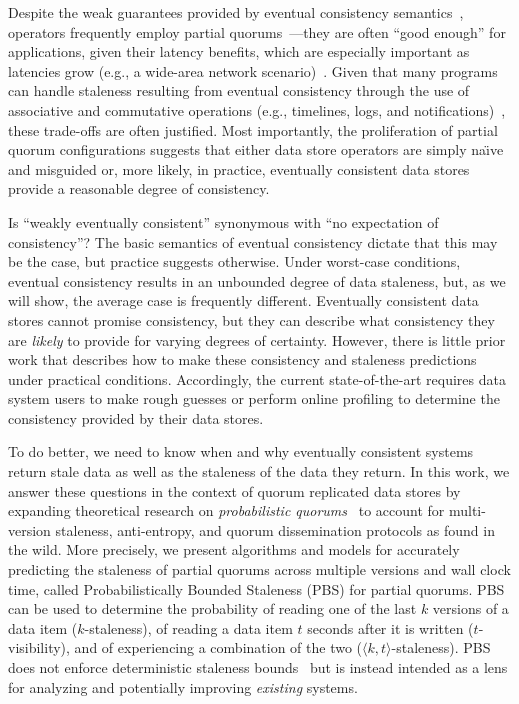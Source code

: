 \documentclass{vldb}
\begin{document}
Despite the weak guarantees provided by eventual consistency
semantics~\cite{hamilton-cap, cops, walter}, operators frequently
employ partial quorums~\cite{cassandra, cassandra-docs,
  cassandradefault,feinbergpc,reddit, outbrain, maxperfblog}---they are
often ``good enough'' for applications, given their latency benefits,
which are especially important as latencies grow (e.g., a wide-area
network scenario)~\cite{abadilatconsist, feinbergpc}.  Given that many
programs can handle staleness resulting from eventual consistency
through the use of associative and commutative operations (e.g.,
timelines, logs, and notifications)~\cite{calm, helland}, these
trade-offs are often justified.  Most importantly, the proliferation
of partial quorum configurations suggests that either data store
operators are simply na\"{\i}ve and misguided or, more likely, in
practice, eventually consistent data stores provide a reasonable degree
of consistency.

Is ``weakly eventually consistent'' synonymous with ``no expectation of
consistency''? The basic semantics of eventual consistency dictate
that this may be the case, but practice suggests otherwise. Under
worst-case conditions, eventual consistency results in an unbounded
degree of data staleness, but, as we will show, the average case is
frequently different.  Eventually consistent data stores cannot
promise consistency, but they can describe what consistency they are
\textit{likely} to provide for varying degrees of certainty.  However,
there is little prior work that describes how to make these
consistency and staleness predictions under practical conditions.
Accordingly, the current state-of-the-art requires data system users
to make rough guesses or perform online profiling to determine the
consistency provided by their data stores.

To do better, we need to know when and why eventually consistent
systems return stale data as well as the staleness of the data they
return.  In this work, we answer these questions in the context of
quorum replicated data stores by expanding theoretical research on
\textit{probabilistic quorums}~\cite{prob-quorum, quorum-overview} to
account for multi-version staleness, anti-entropy, and quorum
dissemination protocols as found in the wild.  More precisely, we
present algorithms and models for accurately predicting the staleness
of partial quorums across multiple versions and wall clock time,
called Probabilistically Bounded Staleness (PBS) for partial
quorums. PBS can be used to determine the probability of reading one
of the last $k$ versions of a data item ($k$-staleness), of reading a
data item $t$ seconds after it is written ($t$-visibility), and of
experiencing a combination of the two ($\langle k, t
\rangle$-staleness). PBS does not enforce deterministic staleness
bounds~\cite{ aqua, trapp,vahdat-article, vahdat-bounded, frac} but is
instead intended as a lens for analyzing and potentially improving
\textit{existing} systems.
\end{document}
